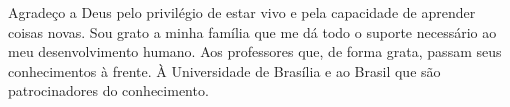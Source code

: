 \begin{agradecimentos}
Agradeço a Deus pelo privilégio de estar vivo e pela capacidade de aprender coisas novas. Sou grato a minha família que me dá todo o suporte
necessário ao meu desenvolvimento humano. Aos professores que, de forma grata, passam seus conhecimentos à frente. À Universidade de Brasília e ao Brasil que são patrocinadores do conhecimento. 
\end{agradecimentos} 